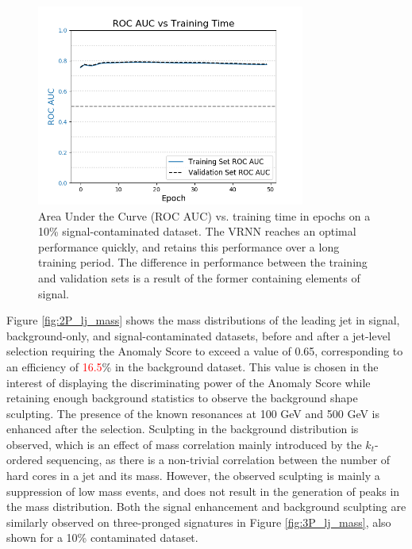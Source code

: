 \documentclass[12pt, a4paper]{article}
\begin{document}
\begin{figure}[H]
	\begin{center}
		\includegraphics[width=250pt]{imgs/bugfix/auc_vs_epoch_1p0_SaveForPaper.png}
	\end{center}
	\caption{Area Under the Curve (ROC AUC) vs. training time in epochs on a 10\% signal-contaminated dataset. The VRNN reaches an optimal performance quickly, and retains this performance over a long training period. The difference in performance between the training and validation sets is a result of the former containing elements of signal.}
	\label{fig:auc_vs_epoch}
\end{figure}

Figure \ref{fig:2P_lj_mass} shows the mass distributions of the leading jet in signal, background-only, and signal-contaminated datasets, before and after a jet-level selection requiring the Anomaly Score to exceed a value of 0.65, corresponding to an efficiency of \textcolor{red}{16.5}\% in the background dataset. 
This value is chosen in the interest of displaying the discriminating power of the Anomaly Score while retaining enough background statistics to observe the background shape sculpting. 
The presence of the known resonances at 100 GeV and 500 GeV is enhanced after the selection. Sculpting in the background distribution is observed, which is an effect of mass correlation mainly introduced by the $k_{t}$-ordered sequencing, as there is a non-trivial correlation between the number of hard cores in a jet and its mass. However, the observed sculpting is mainly a suppression of low mass events, and does not result in the generation of peaks in the mass distribution. Both the signal enhancement and background sculpting are similarly observed on three-pronged signatures in Figure \ref{fig:3P_lj_mass}, also shown for a 10\% contaminated dataset. 
\end{document}
